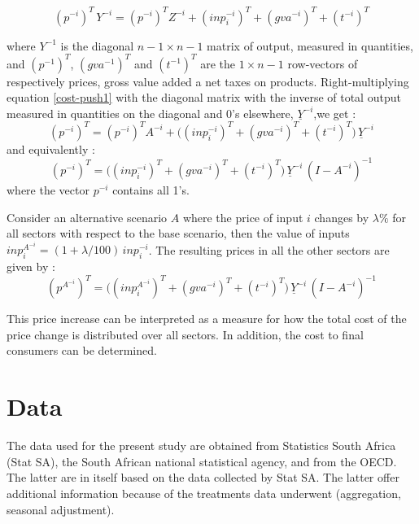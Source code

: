 \documentclass[12pt,english]{article}
\begin{document}
\begin{equation}
(p^{-i})^T \, Y^{-i} = (p^{-i})^T Z^{-i} + (inp^{-i}_i)^T + (gva^{-i})^T + (t^{-i})^T \label{cost-push1}
\end{equation}

where $Y^{-1}$ is the diagonal $n-1 \times n-1$ matrix of output, measured in quantities, and $(p^{-1})^T$, $(gva^{-1})^T$  and $(t^{-1})^T$ are the $1 \times n-1$ row-vectors of respectively prices, gross value added a net taxes on products. Right-multiplying equation \ref{cost-push1} with the diagonal matrix with the inverse of total output measured in quantities on the diagonal and 0's elsewhere, $\underline{Y}^{-i}$,we get :
\begin{equation}
(p^{-i})^T  = (p^{-i})^T A^{-i} + \Big((inp^{-i}_i)^T + (gva^{-i})^T + (t^{-i})^T \Big)\, \underline{Y}^{-i} \label{cost-push2}
\end{equation}
and equivalently :
\begin{equation}
(p^{-i})^T  =  \Big((inp^{-i}_i)^T + (gva^{-i})^T + (t^{-i})^T \Big)\, \underline{Y}^{-i} \, (I - A^{-i})^{-1} \label{cost-push3}
\end{equation}
where the vector $p^{-i}$ contains all 1's.

Consider an alternative scenario $A$ where the price of input $i$ changes by $\lambda\%$ for all sectors with respect to the base scenario, then the value of inputs $inp^{A^{-i}}_{i} = (1+\lambda/100)\, inp^{-i}_i$. The resulting prices in all the other sectors are given by :
\begin{equation}
(p^{A^{-i}})^T  =  \Big((inp^{A^{-i}}_i)^T + (gva^{-i})^T + (t^{-i})^T \Big)\, \underline{Y}^{-i} \, (I - A^{-i})^{-1} \label{cost-push-scen}
\end{equation}

This price increase can be interpreted as a measure for how the total cost of the price change is distributed over all sectors. In addition, the cost to final consumers can be determined. 

\section{Data}

The data used for the present study are obtained from Statistics South Africa (Stat SA), the South African national statistical agency, and from the OECD. The latter are in itself based on the data collected by Stat SA. The latter offer additional information because of the treatments data underwent (aggregation, seasonal adjustment). %
\end{document}
